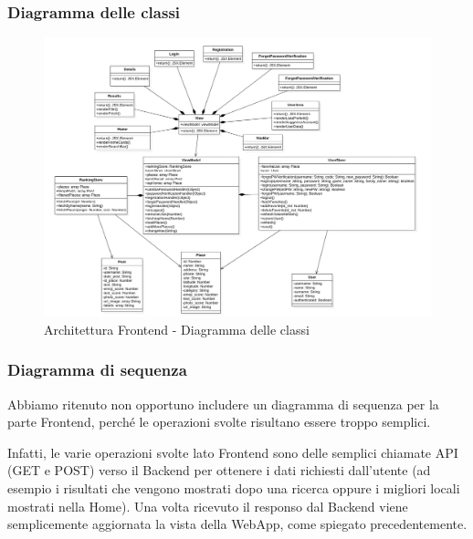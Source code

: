 \subsubsection{Diagramma delle classi}

\begin{figure}[H]
    \centerfloat
    \includegraphics[scale=0.5]{Contenuto/Immagini/DiagrammaClassiFrontEnd.png}
    \caption{Architettura Frontend - Diagramma delle classi}
\end{figure}

\subsubsection{Diagramma di sequenza}

Abbiamo ritenuto non opportuno includere un diagramma di sequenza per la parte Frontend, perché le operazioni svolte risultano essere troppo semplici.

Infatti, le varie operazioni svolte lato Frontend sono delle semplici chiamate API (GET e POST) verso il Backend per ottenere i dati richiesti dall'utente (ad esempio i risultati che vengono mostrati dopo una ricerca oppure i migliori locali mostrati nella Home). Una volta ricevuto il responso dal Backend viene semplicemente aggiornata la vista della WebApp, come spiegato precedentemente.

